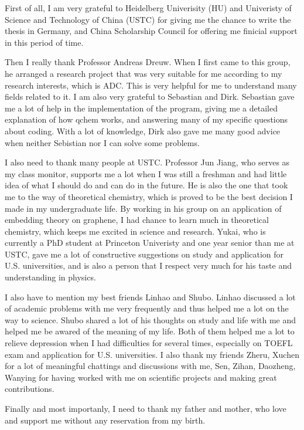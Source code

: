 
\begin{acknowledgements}
	First of all, I am very grateful to Heidelberg Univerisity (HU) and Univeristy of Science and Technology of China (USTC) for giving me the chance to write the thesis in Germany, and China Scholarship Council for offering me finicial support in this period of time.

	Then I really thank Professor Andreas Dreuw.
	When I first came to this group, he arranged a research project that was very suitable for me according to my research interests, which is ADC.
	This is very helpful for me to understand many fields related to it.
	I am also very grateful to Sebastian and Dirk.
	Sebastian gave me a lot of help in the implementation of the program, giving me a detailed explanation of how qchem works, and answering many of my specific questions about coding.
	With a lot of knowledge, Dirk also gave me many good advice when neither Sebistian nor I can solve some problems.

	I also need to thank many people at USTC.
	Professor Jun Jiang, who serves as my class monitor, supports me a lot when I was still a freshman and had little idea of what I should do and can do in the future.
	He is also the one that took me to the way of theoretical chemistry, which is proved to be the best decision I made in my undergraduate life.
	By working in his group on an application of embedding theory on graphene, I had chance to learn much in theoretical chemistry, which keeps me excited in science and research.
	Yukai, who is currently a PhD student at Princeton Univeristy and one year senior than me at USTC, gave me a lot of constructive suggestions on study and application for U.S. universities, and is also a person that I respect very much for his taste and understanding in physics.

	I also have to mention my best friends Linhao and Shubo.
	Linhao discussed a lot of academic problems with me very frequently and thus helped me a lot on the way to science.
	Shubo shared a lot of his thoughts on study and life with me and helped me be awared of the meaning of my life.
	Both of them helped me a lot to relieve depression when I had difficulties for several times, especially on TOEFL exam and application for U.S. universities.
	I also thank my friends Zheru, Xuchen for a lot of meaningful chattings and discussions with me, Sen, Zihan, Daozheng, Wanying for having worked with me on scientific projects and making great contributions.

	Finally and most importanly, I need to thank my father and mother, who love and support me without any reservation from my birth.
\end{acknowledgements}

